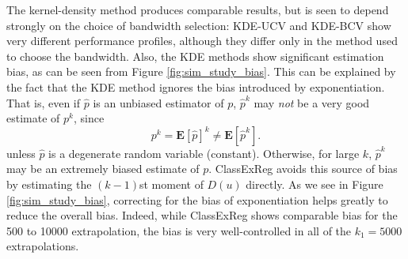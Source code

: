 \documentclass[twoside,11pt]{article}
\newcommand{\E}{\textbf{E}}
\begin{document}
The kernel-density method produces comparable results, but is seen to depend strongly on the choice of bandwidth selection: KDE-UCV and KDE-BCV show very different performance profiles, although they differ only in the method used to choose the bandwidth.
Also, the KDE methods show significant estimation bias, as can be seen from Figure \ref{fig:sim_study_bias}.  
This can be explained by the fact that
the KDE method ignores the bias introduced by exponentiation.
That is, even if $\hat{p}$ is an unbiased estimator of $p$, $\hat{p}^k$ may \emph{not} be a very good estimate of $p^k$, since
\[
p^k = \E[\hat{p}]^k \neq \E[\hat{p}^k].
\]
unless $\hat{p}$ is a degenerate random variable
(constant). Otherwise, for large $k$, $\hat{p}^k$ may be an extremely
biased estimate of $p$.  ClassExReg avoids this source of
bias by estimating the $(k-1)$st moment of $D(u)$ directly.  As we see
in Figure \ref{fig:sim_study_bias}, correcting for the bias of
exponentiation helps greatly to reduce the overall bias.   Indeed, while
ClassExReg shows comparable bias for the 500 to 10000 extrapolation,
the bias is very well-controlled in all of the $k_1 = 5000$ extrapolations.




\end{document}
